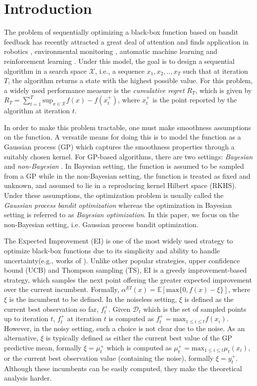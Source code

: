 \documentclass[twoside]{article}
\begin{document}
\section{Introduction}
The problem of sequentially optimizing a black-box function based on bandit feedback has recently attracted a great deal of attention and finds application in robotics \citep{Lizotte07,cantin07}, environmental monitoring \citep{Marchan12}, automatic machine learning \citep{Bergstra11a,Snoek12,hoffman14} and reinforcement learning \citep{wilson14a,balakrishnan2020efficient}. Under this model, the goal is to design a sequential algorithm in a search space $\mathcal X$, i.e., a sequence $x_1, x_2 ,.., x_T$ such that at iteration $T$, the algorithm returns a state with the highest possible value. For this problem, a widely used performance measure is the \emph{cumulative regret} $R_T$, which is given by $R_T = \sum_{t= 1}^{T}\text{sup}_{x \in \mathcal X} f(x) - f(x^+_t)$, where $x^+_t$ is the point reported by the algorithm at iteration $t$.

In order to make this problem tractable, one must make smoothness assumptions on the function. A versatile means for doing this is to model the function as a Gaussian process (GP) which captures the smoothness properties through a suitably chosen kernel. For GP-based algorithms, there are two settings: \emph{Bayesian} \citep{Freitas12,tran-the21a} and \emph{non-Bayesian} \citep{scarlett17a}. In Bayesian setting, the function is assumed to be sampled from a GP while in the non-Bayesian setting, the function is treated as fixed and unknown, and assumed to lie in a reproducing kernel Hilbert space (RKHS). Under these assumptions, the optimization problem is usually called the \emph{Gaussian process bandit optimization} whereas the optimization in Bayesian setting is referred to as \emph{Bayesian optimization}. In this paper, we focus on the non-Bayesian setting, i.e. Gaussian process bandit optimization.

The Expected Improvement (EI) \citep{Mockus74} is one of the most widely used strategy to optimize black-box functions due to its simplicity and ability to handle uncertainty(e.g., works of \citet{osborne2010,wilson14a,Qin17,Malkomes2018,nguyen20d}). Unlike other popular strategies, upper confidence bound (UCB) and Thompson sampling (TS), EI is a greedy improvement-based strategy, which samples the next point offering the greater expected improvement over the current incumbent. Formally, $\alpha^{EI}(x) = \mathbb{E}[\text{max}\{0, f(x) - \xi\}]$, where $\xi$ is the incumbent to be defined. In the noiseless setting, $\xi$ is defined as the current best observation so far, $f^+_t$. Given $\mathcal D_{t}$ which is the set of sampled points up to iteration $t$, $f^+_t$ at iteration $t$ is computed as $f^+_t = \text{max}_{1 \le i \le t} f(x_i)$.
However, in the noisy setting, such a choice is not clear due to the noise.  As an alternative, $\xi$ is typically defined as either the current best value of the GP predictive mean, formally $\xi = \mu^+_t$ which is computed as $\mu^+_t = \text{max}_{1 \le i \le t} \mu_{t}(x_i)$, or the current best observation value (containing the noise), formally $\xi = y^+_t$. Although these incumbents can be easily computed, they make the theoretical analysis harder.
\end{document}
